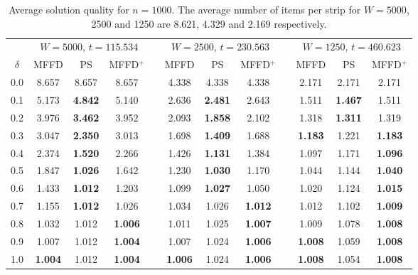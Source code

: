 \documentclass[runningheads]{llncs}
\begin{document}
\begin{table}[!htb]
	\centering
	\caption{Average solution quality for $n = 1000$. The average number of items per strip for $W = 5000$, 2500 and 1250 are 8.621, 4.329 and 2.169 respectively.}
	\begin{tabular}{@{}c@{\hspace{15pt}}c@{\hspace{7pt}}c@{\hspace{5pt}}ccc@{\hspace{7pt}}c@{\hspace{5pt}}ccc@{\hspace{7pt}}c@{\hspace{5pt}}c@{}}\toprule
		& \multicolumn{3}{c}{$W = 5000$, $t = 115.534$} && \multicolumn{3}{c}{$W = 2500$, $t = 230.563$} && \multicolumn{3}{c}{$W = 1250$, $t = 460.623$} \\
		\cmidrule{2-4} \cmidrule{6-8} \cmidrule{10-12}
		$\delta$ & MFFD & PS & MFFD$^+$ && MFFD & PS & MFFD$^+$ && MFFD & PS & MFFD$^+$\\ \midrule
		0.0 & 8.657 & 8.657 & 8.657 && 4.338 & 4.338 & 4.338 && 2.171 & 2.171 & 2.171 \\
		0.1 & 5.173 & \textbf{4.842} & 5.140 && 2.636 & \textbf{2.481} & 2.643 && 1.511 & \textbf{1.467} & 1.511 \\
		0.2 & 3.976 & \textbf{3.462} & 3.952 && 2.093 & \textbf{1.858} & 2.102 && 1.318 & \textbf{1.311} & 1.319 \\
		0.3 & 3.047 & \textbf{2.350} & 3.013 && 1.698 & \textbf{1.409} & 1.688 && \textbf{1.183} & 1.221 & \textbf{1.183} \\
		0.4 & 2.374 & \textbf{1.520} & 2.266 && 1.426 & \textbf{1.131} & 1.384 && 1.097 & 1.171 & \textbf{1.096} \\
		0.5 & 1.847 & \textbf{1.026} & 1.642 && 1.230 & \textbf{1.030} & 1.170 && 1.044 & 1.144 & \textbf{1.040} \\
		0.6 & 1.433 & \textbf{1.012} & 1.203 && 1.099 & \textbf{1.027} & 1.050 && 1.020 & 1.124 & \textbf{1.015} \\
		0.7 & 1.155 & \textbf{1.012} & 1.026 && 1.034 & 1.026 & \textbf{1.012} && 1.012 & 1.102 & \textbf{1.009} \\
		0.8 & 1.032 & 1.012 & \textbf{1.006} && 1.011 & 1.025 & \textbf{1.007} && 1.009 & 1.078 & \textbf{1.008} \\
		0.9 & 1.007 & 1.012 & \textbf{1.004} && 1.007 & 1.024 & \textbf{1.006} && \textbf{1.008} & 1.059 & \textbf{1.008} \\
		1.0 & \textbf{1.004} & 1.012 & \textbf{1.004} && \textbf{1.006} & 1.024 & \textbf{1.006} && \textbf{1.008} & 1.054 & \textbf{1.008} \\
		\bottomrule
	\end{tabular}
	\label{table:n=1000}	
\end{table}
\end{document}
